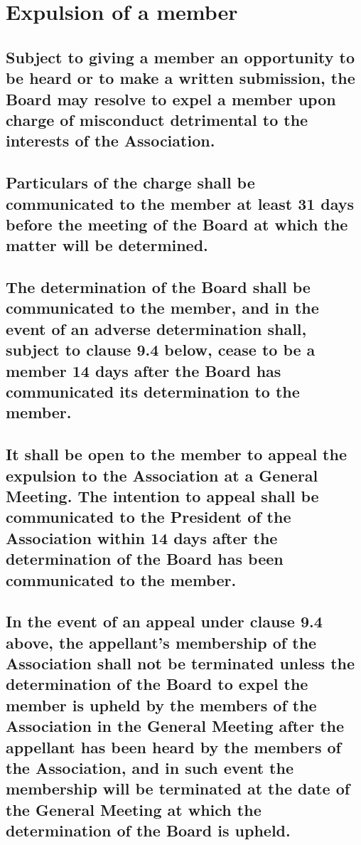 \documentclass{article}
\newenvironment{subs}
  {\adjustwidth{2em}{0pt}}
  {\endadjustwidth}
\begin{document}
\section{Expulsion of a member}
\begin{subs}
\subsection{Subject to giving a member an opportunity to be heard or to make a written submission, the Board may resolve to expel a member upon charge of misconduct detrimental to the interests of the Association.}
\subsection{Particulars of the charge shall be communicated to the member at least 31 days before the meeting of the Board at which the matter will be determined.}
\subsection{The determination of the Board shall be communicated  to the member, and in the event of an adverse determination shall, subject to clause 9.4 below, cease to be a member 14 days after the Board has communicated its determination to the member.}
\newpage

\subsection{It shall be open to the member to appeal the expulsion to the Association at a General Meeting. The intention to appeal shall be communicated to the President of the Association within 14 days after the determination of the Board has been communicated to the member.}
\subsection{In the event of an appeal under clause 9.4 above, the appellant's membership of the Association shall not be terminated unless the determination of the Board to expel the member is upheld by the members of the Association in the General Meeting after the appellant has been heard by the members of the Association, and in such event the membership will be terminated at the date of the General Meeting at which the determination of the Board is upheld.}
\end{subs}
\end{document}
